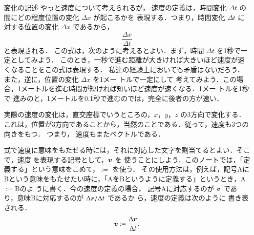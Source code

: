 \begin{memo}{変化の記述}
                やっと速度について考えられるが，
                速度の定義は，時間変化 $\Delta t$ の間にどの程度位置の変化 $\Delta x$ が起こるかを
                表現する．つまり，時間変化 $\Delta t$ に対する位置の変化 $\Delta x$ であるから，
                \begin{equation*}
                \frac{\Delta x}{\Delta t}
                \end{equation*}
                と表現される．
                この式は，次のように考えるとよい．まず，時間 $\Delta t$ を1秒で一定としてみよう．
                このとき，一秒で進む距離が大きければ大きいほど速度が速くなることをこの式は表現する．
                私達の経験上においても矛盾はないだろう．また，逆に，位置の変化 $\Delta x$ を1メー
                トルで一定にして
                考えてみよう．この場合，1メートルを進む時間が短ければ短いほど速度が速くなる．1メー
                トルを1秒で
                進みのと，1メートルを0.1秒で進むのでは，完全に後者の方が速い．

                実際の速度の変化は，直交座標でいうところの，$x$，$y$，$z$ の3方向で変化する．
                これは，位置が3方向であることから，当然のことである．従って，速度も3つの向きをもつ．
                つまり，
                速度もまたベクトルである．

                式で速度に意味をもたせる時には，それに対応した文字を割当てるとよい．そこで，速度
                を表現する記号として，$\boldsymbol{v}$ を
                使うことにしよう．このノートでは，「定義する」という意味をこめて，$:=$ を使う．
                その使用方法は，例えば，記号Aに
                Bという意味をもたせたい時に，「AをBというように定義する」というとき，A$:=$Bのよ
                うに書く．今の速度の定義の場合，
                記号Aに対応するのが $\boldsymbol{v}$ であり，意味Bに対応するのが $\Delta \boldsymbol{r}/\Delta t$ であるか
                ら，速度の定義は次のように
                書き表される．
                    \begin{align}\label{sokudonosiki_1}
                        \bv := \frac{\Delta \br}{\Delta t}.
                    \end{align}


\end{memo}
